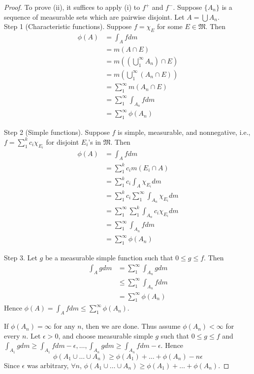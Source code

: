 \documentclass[11pt]{article}
\begin{document}
  \begin{proof} To prove (ii), it suffices to apply (i) to $f^+$ and $f^-$. Suppose $\{ A_n \}$ is a sequence of measurable sets which are pairwise disjoint. Let $A = \bigcup A_n$. \\

    Step 1 (Characteristic functions). Suppose $f = \chi_E$ for some $E \in \mathfrak{M}$. Then \begin{align*} \phi(A) & = \int_A f dm \\ & = m(A \cap E) \\ & = m \left( \left( \bigcup_1^{\infty} A_n \right) \cap E \right) \\ & = m\left( \bigcup_1^\infty (A_n \cap E) \right) \\ & = \sum_1^\infty m(A_n \cap E) \\ & = \sum_1^\infty \int_{A_n} f dm \\ & = \sum_1^\infty \phi(A_n) \end{align*}

    Step 2 (Simple functions). Suppose $f$ is simple, measurable, and nonnegative, i.e., $f = \sum_1^k c_{i} \chi_{E_i}$ for disjoint $E_i$'s in $\mathfrak{M}$. Then \begin{align*} \phi(A) & = \int_A f dm \\ & = \sum_1^k c_i m(E_i \cap A) \\ & = \sum_1^k c_i \int_A \chi_{E_i} dm \\ & = \sum_1^k c_i \sum_1^\infty \int_{A_n} \chi_{E_i} dm \\ & = \sum_1^\infty \sum_1^k \int_{A_n} c_i \chi_{E_i} dm \\ & = \sum_1^\infty \int_{A_n} f dm \\ & = \sum_1^\infty \phi(A_n) \end{align*}

    Step 3. Let $g$ be a measurable simple function such that $0 \le g \le f$. Then \begin{align*} \int_A g dm & = \sum_1^\infty \int_{A_n} g dm \\ & \le \sum_1^\infty \int_{A_n} f dm \\ & = \sum_1^\infty \phi(A_n) \end{align*} Hence $\phi(A) = \int_A f dm \le \sum_1^{\infty} \phi(A_n)$.

    If $\phi(A_n) = \infty$ for any $n$, then we are done. Thus assume $\phi(A_n) < \infty$ for every $n$. Let $\epsilon > 0$, and choose measurable simple $g$ such that $0 \le g \le f$ and $\int_{A_1} g dm \ge \int_{A_1} f dm - \epsilon, \dots, \int_{A_n} g dm \ge \int_{A_n} f dm - \epsilon$. Hence $$\phi(A_1 \cup \dots \cup A_n) \ge \phi(A_1) + \dots + \phi(A_n) - n \epsilon$$Since $\epsilon$ was arbitrary, $\forall n$, $\phi(A_1 \cup \dots \cup A_n) \ge \phi(A_1) + \dots + \phi(A_n)$.
  \end{proof}
\end{document}

